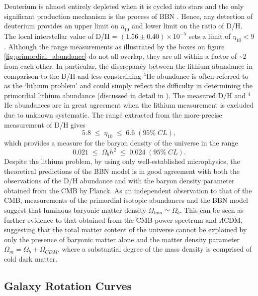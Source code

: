 Deuterium is almost entirely depleted when it is cycled into stars and the only significant production mechanism is the process of BBN \cite{pns}. Hence, any detection of deuterium provides an upper limit on $\eta_{10}$ and lower limit on the ratio of D/H. The local interstellar value of D/H = $(1.56 \pm 0.40) \times 10^{−5}$ sets a limit of $\eta_{10} < 9$ \cite{d_h_measurements}. Although the \eta range measurements as illustrated by the boxes on figure \ref{fig:primordial_abundance} do not all overlap, they are all within a factor of \sim2 from each other. In particular, the discrepancy between the lithium abundance in comparison to the D/H and less-constraining $^4$He abundance is often referred to as the `lithium problem' and could simply reflect the difficulty in determining the primordial lithium abundance (discussed in detail in \cite{Fields_2011}). The measured D/H and $^4$He abundances are in great agreement when the lithium measurement is excluded due to unknown systematic. The \eta range extracted from the more-precise measurement of D/H gives
%
\begin{equation}
    5.8 \; \leq \; \eta_{10} \; \leq \; 6.6 \; (95\% \; CL),
\end{equation}
%
which provides a measure for the baryon density of the universe in the range
%
\begin{equation}
    0.021 \; \leq \; \Omega_{b}h^2 \; \leq \; 0.024 \; (95\% \; CL).
\end{equation}
%
Despite the lithium problem, by using only well-established microphysics, the theoretical predictions of the BBN model is in good agreement with both the observations of the D/H abundance and with the baryon density parameter obtained from the CMB by Planck. As an independent observation to that of the CMB, measurements of the primordial isotopic abundances and the BBN model suggest that luminous baryonic matter density $\Omega_{lum} \simeq \Omega_{b}$. This can be seen as further evidence to that obtained from the CMB power spectrum and $\Lambda$CDM, suggesting that the total matter content of the universe cannot be explained by only the presence of baryonic matter alone and the matter density parameter $\Omega_{m} = \Omega_{b} + \Omega_{CDM}$, where a substantial degree of the mass density is comprised of cold dark matter. 

\subsection{Galaxy Rotation Curves}
\label{subsec:rotation_curves}

